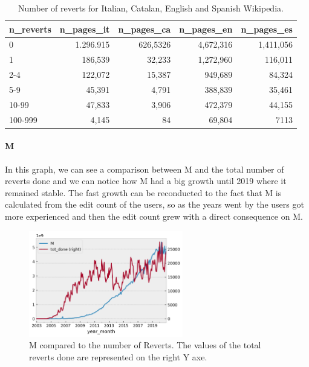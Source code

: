 \begin{table}[H]
    \centering
    \begin{tabularx}{\columnwidth}{@{}Xrrrr@{}}
        \midrule
        \textbf{n\_reverts} & \textbf{n\_pages\_it} & \textbf{n\_pages\_ca}& \textbf{n\_pages\_en} & \textbf{n\_pages\_es}  \\ \toprule
        0 & 1.296.915& 626,5326 & 4,672,316& 1,411,056\\
        1   & 186,539& 32,233 & 1,272,960& 116,011\\
        2-4 & 122,072& 15,387 & 949,689& 84,324\\
        5-9 & 45,391& 4,791 & 388,839& 35,461\\
        10-99 & 47,833& 3,906 & 472,379& 44,155\\
        100-999 & 4,145& 84& 69,804 & 7113\\

        \bottomrule
    \end{tabularx}
    
    \caption{Number of reverts for Italian, Catalan, English and Spanish Wikipedia. \label{table:pagesmorechains}}
\end{table}

\paragraph*{M}
In this graph, we can see a comparison between M and the total number of reverts done and we can
notice how M had a big growth until 2019 where it remained stable. The fast growth can be
reconducted to the fact that M is calculated from the edit count of the users, so as the years went by the
users got more experienced and then the edit count grew with a direct consequence on M.
\begin{figure}[H]
    \centering
    \includegraphics[width=0.6\textwidth]{./chapters/04/assets/Mcompare.png}
    \caption{M compared to the number of Reverts. The values of the total reverts done are represented on the right Y axe.}
    \label{table:mcompare}
\end{figure}
